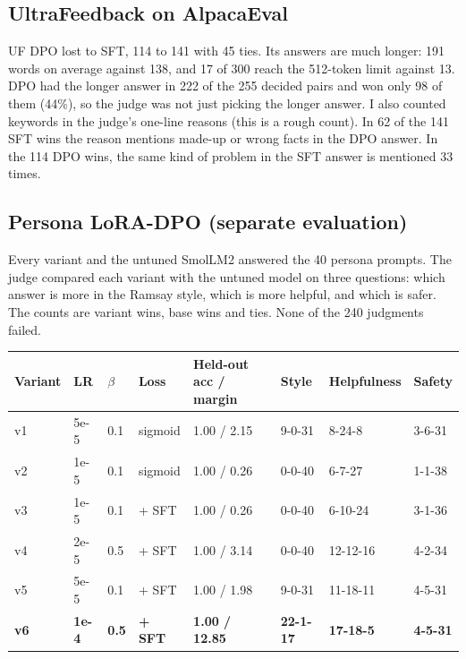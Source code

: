 \documentclass[10pt,a4paper]{article}
\begin{document}
\subsection{UltraFeedback on AlpacaEval}

UF DPO lost to SFT, 114 to 141 with 45 ties. Its answers are much longer: 191 words on average against 138, and 17
of 300 reach the 512-token limit against 13. DPO had the longer answer in 222 of the 255 decided pairs and won only 98
of them (44\%), so the judge was not just picking the longer answer. I also counted keywords in the judge's one-line
reasons (this is a rough count). In 62 of the 141 SFT wins the reason mentions made-up or wrong facts in the DPO answer.
In the 114 DPO wins, the same kind of problem in the SFT answer is mentioned 33 times.

\subsection{Persona LoRA-DPO (separate evaluation)}

Every variant and the untuned SmolLM2 answered the 40 persona prompts. The judge compared each variant with the
untuned model on three questions: which answer is more in the Ramsay style, which is more helpful, and which is safer.
The counts are variant wins, base wins and ties. None of the 240 judgments failed.

\begin{center}\small
\begin{tabular}{llllllll}
\toprule
Variant & LR & $\beta$ & Loss & Held-out acc / margin & Style & Helpfulness & Safety \\
\midrule
v1 & 5e-5 & 0.1 & sigmoid & 1.00 / 2.15 & 9-0-31 & 8-24-8 & 3-6-31 \\
v2 & 1e-5 & 0.1 & sigmoid & 1.00 / 0.26 & 0-0-40 & 6-7-27 & 1-1-38 \\
v3 & 1e-5 & 0.1 & + SFT & 1.00 / 0.26 & 0-0-40 & 6-10-24 & 3-1-36 \\
v4 & 2e-5 & 0.5 & + SFT & 1.00 / 3.14 & 0-0-40 & 12-12-16 & 4-2-34 \\
v5 & 5e-5 & 0.1 & + SFT & 1.00 / 1.98 & 9-0-31 & 11-18-11 & 4-5-31 \\
\textbf{v6} & \textbf{1e-4} & \textbf{0.5} & \textbf{+ SFT} & \textbf{1.00 / 12.85} & \textbf{22-1-17} & \textbf{17-18-5} & \textbf{4-5-31} \\
\bottomrule
\end{tabular}
\end{center}
\end{document}
